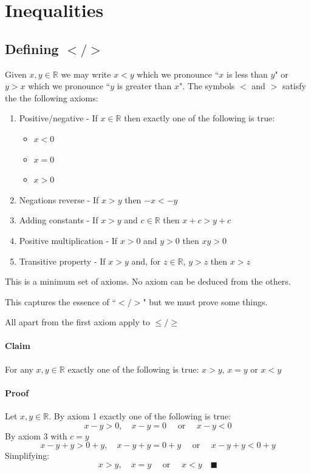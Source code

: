 \documentclass{article}
\newcommand{\bb}[1]{\mathbb{#1}}
\begin{document}
\section{Inequalities}

\subsection*{Defining \(</>\)}

Given \(x,y\in\bb R\) we may write \(x<y\) which we pronounce ``\(x\) is less than \(y\)" or \(y>x\) which we pronounce ``\(y\) is greater than \(x\)". The symbols \(<\) and \(>\) satisfy the the following axioms:
\begin{enumerate}
\item Positive/negative - If \(x\in\bb R\) then exactly one of the following is true:
\begin{itemize}
\item \(x<0\)
\item \(x=0\)
\item \(x>0\)
\end{itemize}
\item Negations reverse - If \(x>y\) then \(-x<-y\)
\item Adding constants - If \(x>y\) and \(c\in\bb R\) then \(x+c>y+c\)
\item Positive multiplication - If \(x>0\) and \(y>0\) then \(xy>0\)
\item Transitive property - If \(x>y\) and, for \(z\in\bb R\), \(y>z\) then \(x>z\)
\end{enumerate}
This is a minimum set of axioms. No axiom can be deduced from the others.

This captures the essence of ``\(</>\)" but we must prove some things.

All apart from the first axiom apply to \(\le/\ge\)

\paragraph{Claim} For any \(x,y\in\bb R\) exactly one of the following is true: \(x>y,\,x=y\text{ or }x<y\)
\paragraph{Proof} Let \(x,y\in\bb R\). By axiom 1 exactly one of the following is true:
\[x-y>0,\quad x-y=0\quad\text{ or }\quad x-y<0\]
By axiom 3 with \(c=y\)
\[ x-y+y>0+y,\quad x-y+y=0+y\quad\text{ or }\quad x-y+y<0+y\]
Simplifying:
\[x>y,\quad x=y\quad\text{ or }\quad x<y\quad\blacksquare\]
\end{document}
